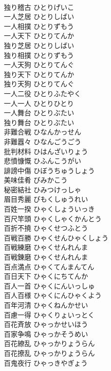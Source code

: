 \documentclass[8pt]{extreport}
\begin{document}
\begin{CJK}{UTF8}{min}
\\	独り稽古	ひとりげいこ	
\\	一人芝居	ひとりしばい	
\\	一人相撲	ひとりずもう	
\\	一人天下	ひとりてんか	
\\	独り芝居	ひとりしばい	
\\	独り相撲	ひとりずもう	
\\	一人天狗	ひとりてんぐ	
\\	独り天下	ひとりてんか	
\\	独り天狗	ひとりてんぐ	
\\	一人二役	ひとりふたやく	
\\	一人一人	ひとりひとり	
\\	一人舞台	ひとりぶたい	
\\	独り舞台	ひとりぶたい	
\\	非難合戦	ひなんかっせん	
\\	非難囂々	ひなんごうごう	
\\	批判材料	ひはんざいりょう	
\\	悲憤慷慨	ひふんこうがい	
\\	誹謗中傷	ひぼうちゅうしょう	
\\	美味佳肴	びみかこう	
\\	秘密結社	ひみつけっしゃ	
\\	眉目秀麗	びもくしゅうれい	
\\	百姓一揆	ひゃくしょういっき	
\\	百尺竿頭	ひゃくしゃくかんとう	
\\	百折不撓	ひゃくせつふとう	
\\	百戦百勝	ひゃくせんひゃくしょう	
\\	百戦練磨	ひゃくせんれんま	
\\	百戦錬磨	ひゃくせんれんま	
\\	百点満点	ひゃくてんまんてん	
\\	百日天下	ひゃくにちてんか	
\\	百人一首	ひゃくにんいっしゅ	
\\	百人百様	ひゃくにんひゃくよう	
\\	百年河清	ひゃくねんかせい	
\\	百慮一得	ひゃくりょいっとく	
\\	百花斉放	ひゃっかせいほう	
\\	百家争鳴	ひゃっかそうめい	
\\	百花繚乱	ひゃっかりょうらん	
\\	百花撩乱	ひゃっかりょうらん	
\\	百鬼夜行	ひゃっきやぎょう	

\end{CJK}
\end{document}
